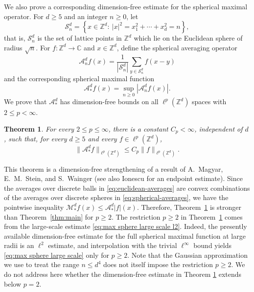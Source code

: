 \documentclass{article}
\newcommand{\Z}{\mathbb Z}
\theoremstyle{plain}
\newtheorem{theorem}{Theorem}
\numberwithin{equation}{section}
\begin{document}
We also prove a corresponding dimension-free estimate for the spherical maximal operator. For \(d\geq 5\) and an integer \(n\geq 0\), let
\begin{equation*}
 \mathcal S_n^d
 =\left\{x\in\mathbb Z^d:\ |x|^2=x_1^2+\cdots+x_d^2=n\right\},
\end{equation*}
that is, $\mathcal S_n^d$ is the set of lattice points in $\Z^d$ which lie on the Euclidean sphere of radius $\sqrt{n}$. For \(f:\mathbb Z^d\to\mathbb C\) and \(x\in\mathbb Z^d\), define the spherical averaging operator
\begin{equation}\label{eq:spherical-averages}
 \mathcal A_n^df(x)
 =\frac1{|\mathcal S_n^d|}\sum_{y\in\mathcal S_n^d}f(x-y)
\end{equation}
and the corresponding spherical maximal function
\begin{equation*}
 \mathcal A_*^df(x)=\sup_{n\geq 0}|\mathcal A_n^df(x)|.
\end{equation*}
We prove that $\mathcal A_*^d$ has dimension-free bounds on all $\ell^p(\Z^d)$ spaces with $2\leq p<\infty$.
\begin{theorem}\label{thm:main:sphere}
For every \(2\leq p\leq\infty\), there is a constant \(C_p<\infty\), independent
of \(d\), such that, for every \(d\geq 5\) and every
\(f\in\ell^p(\mathbb Z^d)\),
\[
 \|\mathcal A_*^df\|_{\ell^p(\mathbb Z^d)}
 \leq C_p\|f\|_{\ell^p(\mathbb Z^d)}.
\]
\end{theorem}
\noindent This theorem is a dimension-free strengthening of a result of A.~Magyar, E.~M.~Stein, and S.~Wainger \cite{MagyarSteinWainger} (see also Ionescu \cite{Ionescu} for an endpoint estimate). Since the averages over discrete balls in \eqref{eq:euclidean-averages} are convex combinations of the averages over discrete spheres in \eqref{eq:spherical-averages}, we have the pointwise inequality $\mathcal M_*^df(x)\leq \mathcal A_*^d|f|(x)$. Therefore, Theorem~\ref{thm:main:sphere} is stronger than Theorem~\ref{thm:main} for $p\geq 2$. 
The restriction \(p\geq2\) in Theorem~\ref{thm:main:sphere} comes from the large-scale estimate \eqref{eq:max sphere large scale l2}. Indeed, the presently available dimension-free estimate for the full spherical maximal function at large radii is an \(\ell^2\) estimate, and interpolation with the trivial \(\ell^\infty\) bound yields \eqref{eq:max sphere large scale} only for \(p\geq2\). Note that the Gaussian approximation we use to treat the range \(n\leq d^4\) does not itself impose the restriction $p\ge 2$. We do not address here whether the dimension-free estimate in Theorem \ref{thm:main:sphere} extends below \(p=2\).
\end{document}
